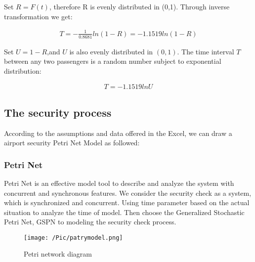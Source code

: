 Set $R=F(t)$, therefore R is evenly distributed in (0,1). Through inverse transformation we get:

\begin{equation}
\left.
\begin{aligned}
	T=-\frac{1}{0.8681}ln(1-R)=-1.1519ln(1-R)
\end{aligned}
\right.
\end{equation}

Set $U=1-R$,and $U$ is also evenly distributed in $(0,1)$. The time interval $T$ between any two passengers is a random number subject to exponential distribution:

\begin{equation}
\left.
\begin{aligned}
	T=-1.1519ln U
\end{aligned}
\right.
\end{equation}

\subsection{The security process}
According to the assumptions and data offered in the Excel, we can draw a airport security Petri Net Model as followed:

\subsubsection*{Petri Net}
Petri Net is an effective model tool to describe and analyze the system with concurrent and synchronous features. We consider the security check as a system, which is synchronized and concurrent. Using time parameter based on the actual situation to analyze the time of model. Then choose the Generalized Stochastic Petri Net, GSPN to modeling the security check process.

\begin{figure}[H]
\centering
\texttt{[image: /Pic/patrymodel.png]}
\caption{Petri network diagram}\label{fig:Petri_Pic}
\end{figure}



